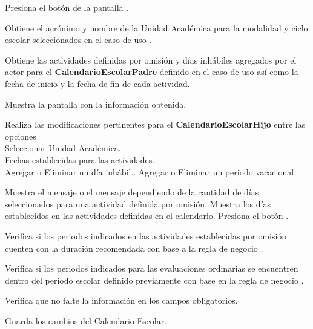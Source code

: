 \begin{UCtrayectoria}

\UCpaso [\UCactor] Presiona el botón  de la pantalla .

\UCpaso Obtiene el acrónimo y nombre de la Unidad Académica para la modalidad y ciclo escolar seleccionados en el caso de uso . 

\UCpaso  Obtiene las actividades definidas por omisión y días inhábiles agregados por el actor para el \textbf{CalendarioEscolarPadre} definido en el caso de uso  así como la fecha de inicio y la fecha de fin de cada actividad.

\UCpaso Muestra la pantalla  con la información obtenida.


\UCpaso [\UCactor] Realiza las modificaciones pertinentes para el \textbf{CalendarioEscolarHijo} entre las opciones \\
Seleccionar Unidad Académica.\\
Fechas establecidas para las actividades.\\
Agregar o Eliminar un día inhábil..
Agregar o Eliminar un periodo vacacional.     

\UCpaso Muestra el mensaje  o el mensaje  dependiendo de la cantidad de días seleccionados para una actividad definida por omisión.
\UCpaso \label{IN-DAE-CU2.6:dia}Muestra los días establecidos en las actividades definidas en el calendario.
\UCpaso[\UCactor]Presiona el botón .

\UCpaso Verifica si los periodos indicados en las actividades establecidas por omisión cuenten con la duración recomendada con base a la regla de negocio . 


\UCpaso Verifica si los periodos indicados para las evaluaciones ordinarias se encuentren dentro del periodo escolar definido previamente con base en la regla de negocio . 

\UCpaso Verifica que no falte la información en los  campos obligatorios. 

\UCpaso Guarda los cambios del Calendario Escolar.


\end{UCtrayectoria}
